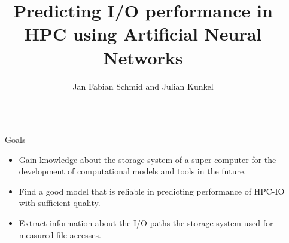 \documentclass[final]{beamer}
\title{Predicting I/O performance in HPC using Artificial Neural Networks} %
\author{Jan Fabian Schmid and Julian Kunkel} %
\institute{Universität Hamburg} %
\newlength{\sepwid}
\newlength{\onecolwid}
\begin{document}
	
	\small


\setlength{\belowcaptionskip}{2ex} %
\setlength\belowdisplayshortskip{2ex} %

\begin{frame}[t] %

\begin{columns}[t] %

\begin{column}{\sepwid}\end{column} %

\setlength{\sepwid}{0.02\paperwidth} %

\begin{column}{\onecolwid} %


	\small


\begin{alertblock}{Goals}
	

\begin{itemize}
\item Gain knowledge about the storage system of a super computer for the development of computational models and tools in the future.
\item Find a good model that is reliable in predicting performance of HPC-IO with sufficient quality.
\item Extract information about the I/O-paths the storage system used for measured file accesses.
\end{itemize}


\end{alertblock}
\end{column}
\end{columns}
\end{frame}
\end{document}
